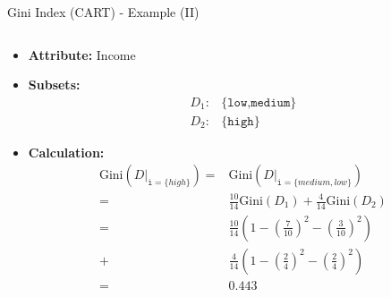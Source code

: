 \begin{frame}{Gini Index (CART) - Example (II)}
	\begin{columns}
		\begin{column}{0.45\textwidth}
			\vspace*{-2em}
			\begin{itemize}
				\item \textbf{Attribute:} Income \medskip
				\item \textbf{Subsets:}
				      {
					      \footnotesize
					      \begin{align*}
						      D_1: & \{\texttt{low,medium}\} \\
						      D_2: & \{\texttt{high}\}
					      \end{align*}
				      }
				\item \textbf{Calculation:}
				      {
					      \footnotesize
					      \begin{align*}
						      \text{Gini}(D\vert_{\texttt{i}=\{high\}}) = & \text{Gini}(D\vert_{\texttt{i}=\{medium,low\}})                                             \\
						      =                                           & \frac{10}{14} \text{Gini}(D_1) + \frac{4}{14} \text{Gini}(D_2)                              \\
						      =                                           & \frac{10}{14} \left(1-\left( \frac{7}{10} \right)^2 - \left( \frac{3}{10} \right)^2 \right) \\
						      +                                           & \frac{4}{14} \left( 1-\left( \frac{2}{4} \right)^2 - \left( \frac{2}{4} \right)^2 \right)   \\
						      =                                           & 0.443
					      \end{align*}
				      }
			\end{itemize}



\end{column}
\end{columns}
\end{frame}
